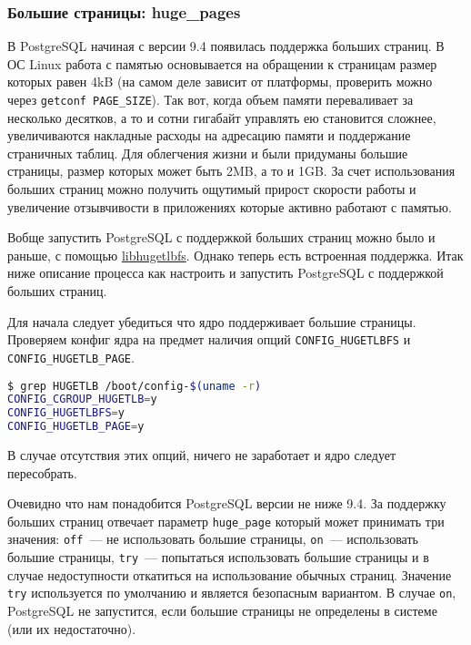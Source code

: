 \subsubsection{Большие страницы: huge\_pages}


В PostgreSQL начиная с версии 9.4 появилась поддержка больших страниц. В ОС Linux работа с памятью основывается на обращении к страницам размер которых равен 4kB (на самом деле зависит от платформы, проверить можно через \lstinline!getconf PAGE_SIZE!). Так вот, когда объем памяти переваливает за несколько десятков, а то и сотни гигабайт управлять ею становится сложнее, увеличиваются накладные расходы на адресацию памяти и поддержание страничных таблиц. Для облегчения жизни и были придуманы большие страницы, размер которых может быть 2MB, а то и 1GB. За счет использования больших страниц можно получить ощутимый прирост скорости работы и увеличение отзывчивости в приложениях которые активно работают с памятью.

Вобще запустить PostgreSQL с поддержкой больших страниц можно было и раньше, с помощью \href{http://www.thislinux.org/2012/08/postgresql-with-hugepages.html}{libhugetlbfs}. Однако теперь есть встроенная поддержка. Итак ниже описание процесса как настроить и запустить PostgreSQL с поддержкой больших страниц.

Для начала следует убедиться что ядро поддерживает большие страницы. Проверяем конфиг ядра на предмет наличия опций \lstinline!CONFIG_HUGETLBFS! и \lstinline!CONFIG_HUGETLB_PAGE!.

\begin{lstlisting}[language=Bash,label=lst:settings_hugepages1,caption=Проверка конфига ядра на поддержку huge pages]
$ grep HUGETLB /boot/config-$(uname -r)
CONFIG_CGROUP_HUGETLB=y
CONFIG_HUGETLBFS=y
CONFIG_HUGETLB_PAGE=y
\end{lstlisting}

В случае отсутствия этих опций, ничего не заработает и ядро следует пересобрать.

Очевидно что нам понадобится PostgreSQL версии не ниже 9.4. За поддержку больших страниц отвечает параметр \lstinline!huge_page! который может принимать три значения: \lstinline!off!~--- не использовать большие страницы, \lstinline!on!~--- использовать большие страницы, \lstinline!try!~--- попытаться использовать большие страницы и в случае недоступности откатиться на использование обычных страниц. Значение \lstinline!try! используется по умолчанию и является безопасным вариантом. В случае \lstinline!on!, PostgreSQL не запустится, если большие страницы не определены в системе (или их недостаточно).

